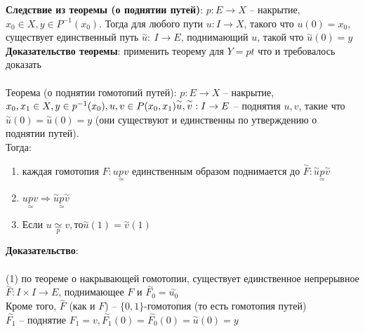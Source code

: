 	\textbf{Следствие из теоремы (о поднятии путей)}: $p: E\rightarrow X$ -- накрытие, $x_0 \in X, y\in P^{-1} (x_0)$. Тогда для любого пути $u: I\rightarrow X$, такого что $u(0) = x_0$, существует единственный путь $\overset{\sim}{u}:\ I \rightarrow E$, поднимающий $u$, такой что $\overset{\sim}{u} (0) = y$\\
	\textbf{Доказательство теоремы}: применить теорему для $Y = pt$ что и требовалось доказать\\
	\\
	Теорема (о поднятии гомотопий путей): $p: E \rightarrow X$ -- накрытие, $x_0, x_1 \in X, y\in p^{-1} (x_0), u,v\in P(x_0,x_1)\\
	\overset{\sim}{u}, \overset{\sim}{v}: I \rightarrow E$ -- поднятия $u,v$, такие что $\overset{\sim}{u} (0) = \overset{\sim}{u} (0) = y$ (они существуют и единственны по утверждению о поднятии путей).\\
	Тогда:
	\begin{enumerate}
		\item каждая гомотопия $F: u \underset{\simeq}{p} v$ единственным образом поднимается до $\overset{\sim}{F}: \overset{\sim}{u} \underset{\simeq}{p}\overset{\sim}{v}$\\
		\item $ u \underset{\simeq}{p} v \Rightarrow \overset{\sim}{u} \underset{\simeq}{p}\overset{\sim}{v}$\\
		\item Если $u \underset{p}{\simeq} v, то \overset{\sim}{u} (1) = \overset{\sim}{v} (1)$\\
		\begin{comment}
		\begin{figure}[h]
		\center{\texttt{[image: 15-1.png]}}
		\end{figure}\\
		\end{comment}
	\end{enumerate}
	\textbf{Доказательство}:\\ 
	\\
	(1) по теореме о накрывающей гомотопии, существует единственное непрерывное $\overset{\sim}{F}: I\times I \rightarrow E$, поднимающее $F$ и $\overset{\sim}{F_0} = \overset{\sim}{u_0}$\\
	Кроме того, $\overset{\sim}{F}$ (как и $F$) -- $\{0,1\}$-гомотопия (то есть гомотопия путей)\\
	$\overset{\sim}{F_1}$ -- поднятие $F_1 = v, \overset{\sim}{F_1} (0) = \overset{\sim}{F_0} (0) = \overset{\sim}{u} (0) = y$\\
